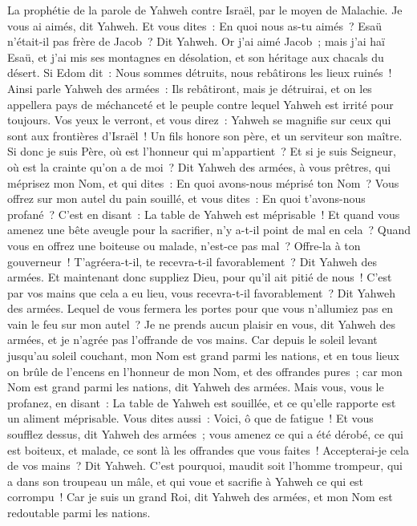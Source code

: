 \begin{multicols}{2}
\VerseOne{}La prophétie de la parole de Yahweh contre Israël, par le moyen de Malachie.
Je vous ai aimés, dit Yahweh. Et vous dites~: En quoi nous as-tu aimés~? Esaü n'était-il pas frère de Jacob~? Dit Yahweh. Or j'ai aimé Jacob~;
mais j'ai haï Esaü, et j'ai mis ses montagnes en désolation, et son héritage aux chacals du désert.
Si Edom dit~: Nous sommes détruits, nous rebâtirons les lieux ruinés~! Ainsi parle Yahweh des armées~: Ils rebâtiront, mais je détruirai, et on les appellera pays de méchanceté et le peuple contre lequel Yahweh est irrité pour toujours.
Vos yeux le verront, et vous direz~: Yahweh se magnifie sur ceux qui sont aux frontières d'Israël~!
Un fils honore son père, et un serviteur son maître. Si donc je suis Père, où est l'honneur qui m'appartient~? Et si je suis Seigneur, où est la crainte qu'on a de moi~? Dit Yahweh des armées, à vous prêtres, qui méprisez mon Nom, et qui dites~: En quoi avons-nous méprisé ton Nom~?
Vous offrez sur mon autel du pain souillé, et vous dites~: En quoi t'avons-nous profané~? C'est en disant~: La table de Yahweh est méprisable~!
Et quand vous amenez une bête aveugle pour la sacrifier, n'y a-t-il point de mal en cela~? Quand vous en offrez une boiteuse ou malade, n'est-ce pas mal~? Offre-la à ton gouverneur~! T'agréera-t-il, te recevra-t-il favorablement~? Dit Yahweh des armées.
Et maintenant donc suppliez Dieu, pour qu'il ait pitié de nous~! C'est par vos mains que cela a eu lieu, vous recevra-t-il favorablement~? Dit Yahweh des armées.
Lequel de vous fermera les portes pour que vous n'allumiez pas en vain le feu sur mon autel~? Je ne prends aucun plaisir en vous, dit Yahweh des armées, et je n'agrée pas l'offrande de vos mains.
Car depuis le soleil levant jusqu'au soleil couchant, mon Nom est grand parmi les nations, et en tous lieux on brûle de l'encens en l'honneur de mon Nom, et des offrandes pures~; car mon Nom est grand parmi les nations, dit Yahweh des armées.
Mais vous, vous le profanez, en disant~: La table de Yahweh est souillée, et ce qu'elle rapporte est un aliment méprisable.
Vous dites aussi~: Voici, ô que de fatigue~! Et vous soufflez dessus, dit Yahweh des armées~; vous amenez ce qui a été dérobé, ce qui est boiteux, et malade, ce sont là les offrandes que vous faites~! Accepterai-je cela de vos mains~? Dit Yahweh.
C'est pourquoi, maudit soit l'homme trompeur, qui a dans son troupeau un mâle, et qui voue et sacrifie à Yahweh ce qui est corrompu~! Car je suis un grand Roi, dit Yahweh des armées, et mon Nom est redoutable parmi les nations.

\end{multicols}
